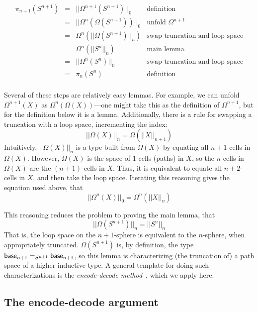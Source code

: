 \[
\begin{array}{rcll}
\pi_{n+1}(S^{n+1}) & = & ||\Omega^{n+1}(S^{n+1})||_0 & \text{definition}\\
                  & = & ||\Omega^{n}(\Omega(S^{n+1}))||_0 & \text{unfold $\Omega^{n+1}$} \\
                  & = & \Omega^{n}(||\Omega(S^{n+1})||_n) & \text{swap truncation and loop space} \\
                  & = & \Omega^{n}(||S^{n}||_n) & \text{main lemma} \\
                  & = & ||\Omega^{n}(S^{n})||_0 & \text{swap truncation and loop space} \\
                  & = & \pi_n(S^n) & \text{definition} \\
\end{array}
\]

Several of these steps are relatively easy lemmas.  For example, we can
unfold $\Omega^{n+1}(X)$ as $\Omega^n(\Omega(X))$---one might
take this as the definition of $\Omega^{n+1}$, but for the definition
below it is a lemma.  Additionally, there is a rule for swapping
a truncation with a loop space, incrementing the index:
\[
||\Omega(X)||_n = \Omega(||X||_{n+1})
\]
Intuitively, $||\Omega(X)||_n$ is a type built from $\Omega(X)$ by
equating all $n+1$-cells in $\Omega(X)$.  However, $\Omega(X)$ is the
space of 1-cells (paths) in $X$, so the $n$-cells in $\Omega(X)$ are the
$(n+1)$-cells in $X$.  Thus, it is equivalent to equate all $n+2$-cells in
$X$, and then take the loop space.  Iterating this reasoning gives the
equation used above, that
\[
||\Omega^n(X)||_0 = \Omega^n(||X||_{n})
\]

This reasoning reduces the problem to proving the main lemma, that 
\[
||\Omega(S^{n+1})||_n = ||S^{n}||_n
\]
That is, the loop space on the $n+1$-sphere is equivalent to the
$n$-sphere, when appropriately truncated.  $\Omega(S^{n+1})$ is, by
definition, the type $\mathsf{base}_{n+1} =_{S^{n+1}} \mathsf{base}_{n+1}$, 
so this lemma is characterizing (the truncation of) a path space of a
higher-inductive type.  A general template for doing such
characterizations is the 
\emph{encode-decode method}~\citep[Section 8.9]{uf13hott-book}, which we
apply here.  

\subsection{The encode-decode argument}

